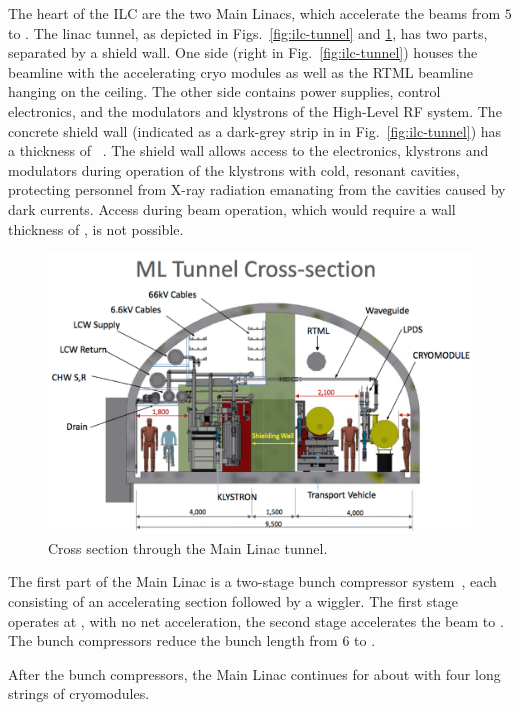 The heart of the ILC are the two Main Linacs, which accelerate the beams from $5$ to .
The linac tunnel, as depicted in Figs.~\ref{fig:ilc-tunnel} and \ref{fig:ml-tunnel}, has two parts, separated by a shield wall. 
One side (right in Fig.~\ref{fig:ilc-tunnel}) houses the beamline with the accelerating cryo modules as well as the RTML beamline hanging on the ceiling.
The other side contains power supplies, control electronics, and the modulators and klystrons of the High-Level RF system.
The concrete shield wall (indicated as a dark-grey strip in in Fig.~\ref{fig:ilc-tunnel}) has a thickness of ~\cite{bib:cr-0012}.
The shield wall allows access to the electronics, klystrons and modulators during operation of the klystrons with cold, resonant cavities, protecting personnel from X-ray radiation emanating from the cavities caused by dark currents.
Access during beam operation, which would require a wall thickness of , is not possible.

\begin{figure}[htbp]
   \includegraphics[width=\hsize]{chapters/figures/ML-cross-section}
\caption{Cross section through the Main Linac tunnel.}
\label{fig:ml-tunnel}
\end{figure}

The first part of the Main Linac is a two-stage bunch compressor system~\cite[Sec. 7.3.3.5]{Adolphsen:2013kya}, each consisting of an accelerating section followed by a wiggler. 
The first stage operates at , with no net acceleration, the second stage accelerates the beam to .
The bunch compressors reduce the bunch length from $6$ to .

After the bunch compressors, the Main Linac continues for about  with four long strings of cryomodules. 

